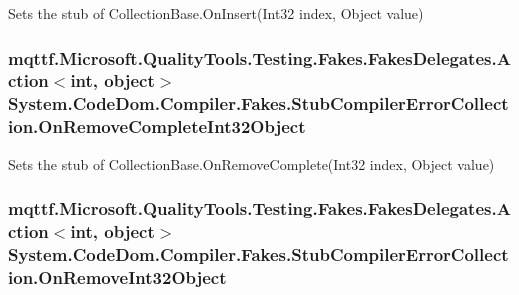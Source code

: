 Sets the stub of Collection\-Base.\-On\-Insert(\-Int32 index, Object value)

\hypertarget{class_system_1_1_code_dom_1_1_compiler_1_1_fakes_1_1_stub_compiler_error_collection_ac70cd57635b593dda2dcbd68eb308ba2}{
\subsubsection[{On\-Remove\-Complete\-Int32\-Object}]{\setlength{\rightskip}{0pt plus 5cm}mqttf.\-Microsoft.\-Quality\-Tools.\-Testing.\-Fakes.\-Fakes\-Delegates.\-Action$<$int, object$>$ System.\-Code\-Dom.\-Compiler.\-Fakes.\-Stub\-Compiler\-Error\-Collection.\-On\-Remove\-Complete\-Int32\-Object}}\label{class_system_1_1_code_dom_1_1_compiler_1_1_fakes_1_1_stub_compiler_error_collection_ac70cd57635b593dda2dcbd68eb308ba2}


Sets the stub of Collection\-Base.\-On\-Remove\-Complete(\-Int32 index, Object value)

\hypertarget{class_system_1_1_code_dom_1_1_compiler_1_1_fakes_1_1_stub_compiler_error_collection_a84c5bb02b7b32ab9b85c7f70665a4662}{
\subsubsection[{On\-Remove\-Int32\-Object}]{\setlength{\rightskip}{0pt plus 5cm}mqttf.\-Microsoft.\-Quality\-Tools.\-Testing.\-Fakes.\-Fakes\-Delegates.\-Action$<$int, object$>$ System.\-Code\-Dom.\-Compiler.\-Fakes.\-Stub\-Compiler\-Error\-Collection.\-On\-Remove\-Int32\-Object}}\label{class_system_1_1_code_dom_1_1_compiler_1_1_fakes_1_1_stub_compiler_error_collection_a84c5bb02b7b32ab9b85c7f70665a4662}


